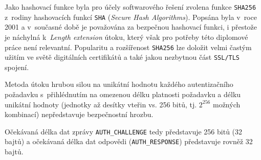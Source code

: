 \documentclass[thesis=M,czech]{FITthesis}[2012/10/20]
\begin{document}
Jako hashovací funkce byla pro účely softwarového řešení zvolena funkce \texttt{SHA256} z~rodiny hashovacích funkcí \texttt{SHA} (\textit{Secure Hash Algorithms}). Popsána byla v~roce 2001 a v~současné době je považována za bezpečnou hashovací funkci, i přestože je náchylná k~\textit{Length extension} útoku, který však pro potřeby této diplomové práce není relevantní. Popularitu a rozšířenost \texttt{SHA256} lze doložit velmi častým užitím ve světě digitálních certifikátů a také jakou nezbytnou část \texttt{SSL/TLS} spojení.

Metoda útoku hrubou silou na unikátní hodnotu každého autentizačního požadavku s~přihlédnutím na omezenou délku platnosti požadavku a délku unikátní hodnoty (jednotky až desítky vteřin vs. 256 bitů, tj. $2^{256}$ možných kombinací) nepředstavuje bezpečnostní hrozbu.

Očekávaná délka dat zprávy \texttt{AUTH\_CHALLENGE} tedy představuje 256 bitů (32 bajtů) a očekávaná délka dat odpovědi (\texttt{AUTH\_RESPONSE}) představuje rovněž 32 bajtů.
\end{document}
